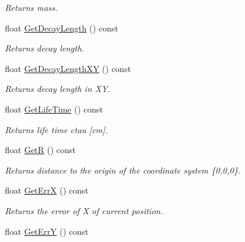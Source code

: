 \begin{DoxyCompactItemize}
\begin{DoxyCompactList}\small\item\em Returns mass. \end{DoxyCompactList}\item 
float \hyperlink{classKFParticle_a34e5c0327a0c751be4b3e5d94f3e7397}{Get\+Decay\+Length} () const \hypertarget{classKFParticle_a34e5c0327a0c751be4b3e5d94f3e7397}{}\label{classKFParticle_a34e5c0327a0c751be4b3e5d94f3e7397}

\begin{DoxyCompactList}\small\item\em Returns decay length. \end{DoxyCompactList}\item 
float \hyperlink{classKFParticle_a4c93b7924e17f83fca4e60294322ce94}{Get\+Decay\+Length\+XY} () const \hypertarget{classKFParticle_a4c93b7924e17f83fca4e60294322ce94}{}\label{classKFParticle_a4c93b7924e17f83fca4e60294322ce94}

\begin{DoxyCompactList}\small\item\em Returns decay length in XY. \end{DoxyCompactList}\item 
float \hyperlink{classKFParticle_adaa76bf36576d161af9f1d31a54d4642}{Get\+Life\+Time} () const \hypertarget{classKFParticle_adaa76bf36576d161af9f1d31a54d4642}{}\label{classKFParticle_adaa76bf36576d161af9f1d31a54d4642}

\begin{DoxyCompactList}\small\item\em Returns life time ctau \mbox{[}cm\mbox{]}. \end{DoxyCompactList}\item 
float \hyperlink{classKFParticle_ad53e12b3f5e3ea5fe626f5da798ba6b1}{GetR} () const \hypertarget{classKFParticle_ad53e12b3f5e3ea5fe626f5da798ba6b1}{}\label{classKFParticle_ad53e12b3f5e3ea5fe626f5da798ba6b1}

\begin{DoxyCompactList}\small\item\em Returns distance to the origin of the coordinate system \{0,0,0\}. \end{DoxyCompactList}\item 
float \hyperlink{classKFParticle_a8dc2a3b77fce50215337e660085bf969}{Get\+ErrX} () const \hypertarget{classKFParticle_a8dc2a3b77fce50215337e660085bf969}{}\label{classKFParticle_a8dc2a3b77fce50215337e660085bf969}

\begin{DoxyCompactList}\small\item\em Returns the error of X of current position. \end{DoxyCompactList}\item 
float \hyperlink{classKFParticle_a3cc152ee00d5c702adb79dfeffb4739a}{Get\+ErrY} () const \hypertarget{classKFParticle_a3cc152ee00d5c702adb79dfeffb4739a}{}\label{classKFParticle_a3cc152ee00d5c702adb79dfeffb4739a}


\end{DoxyCompactItemize}

